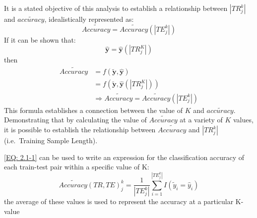 \documentclass[12pt,]{article}
\begin{document}
It is a stated objective of this analysis to establish a relationship
between \(|TR_{j}^{k}|\) and \(\tilde{accuracy}\), idealistically
represented as: \[
\tilde{Accuracy} = \tilde{Accuracy}\left( |TE_{j}^{k}|  \right)  \tag{EQ-XX} 
\] If it can be shown that:
\[\mathbf{\hat{y}}=\mathbf{\hat{y}}\left(|TR_{j}^{K}| \right) \] then
\begin{align*}
\tilde{Accuracy} &= f\left(\mathbf{\tilde{y}}, \mathbf{\hat{y}} \right) \\[0.5em]
&= f\left(\mathbf{\tilde{y}}, \mathbf{\hat{y}} (|TR_{j}^{K}|)  \right) \\[0.5em]
&\Rightarrow \tilde{Accuracy}= \tilde{Accuracy}\left( |TE_{j}^{k}|  \right)
\end{align*} This formula establishes a connection between the value of
\(K\) and \(\tilde{accuracy}\). Demonstrating that by calculating the
value of \(\tilde{Accuracy}\) at a variety of \(K\) values, it is
possible to establish the relationship between \(\tilde{Accuracy}\) and
\(|TR_{j}^{k}|\) (i.e.~Training Sample Length).

\eqref{EQ: 2.1-1} can be used to write an expression for the
classification accuracy of each train-test pair within a specific value
of K:
\[\tilde{Accuracy}\left(TR, TE \right)_{j}^{k}= \frac{1}{|TE_{j}^{k}|} \sum_{i=1}^{|TE_{j}^{k}|} I\left(\tilde{y}_{i}=\hat{y}_{i} \right) \]
the average of these values is used to represent the accuracy at a
particular K-value
\end{document}
